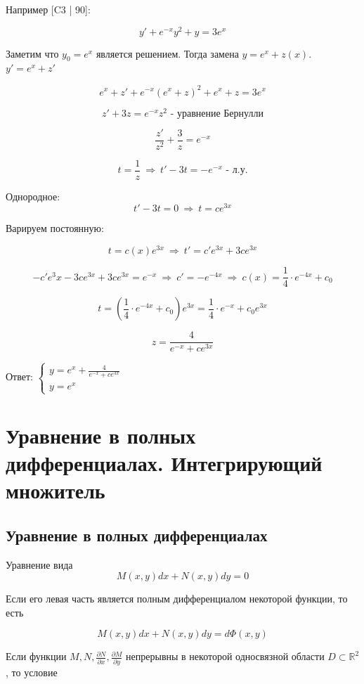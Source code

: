 Например [C3 | 90]:

\[
y'+e^{-x}y^2+y=3e^x
\]

Заметим что $y_0=e^x$ является решением. Тогда замена $y=e^x+z(x)$. $y'=e^x+z'$

\[
e^x+z'+e^{-x}(e^x+z)^2+e^x+z=3e^x
\]

\[
z'+3z=e^{-x}z^2 \text{ - уравнение Бернулли}
\]

\[
\frac{z'}{z^2}+\frac{3}{z}=e^{-x}
\]

\[
t=\frac{1}{z}\ \Rightarrow \ t'-3t=-e^{-x} \text{ - л.у.} 
\]

Однородное:
\[
t'-3t=0\ \Rightarrow \ t=ce^{3x}
\]

Варируем постоянную:

\[
t=c(x)e^{3x} \ \Rightarrow \ t'=c'e^{3x} + 3ce^{3x}
\]

\[
-c'e^3x-3ce^{3x}+3ce^{3x}=e^{-x} \ \Rightarrow \ c'=-e^{-4x} \ \Rightarrow \ c(x)=\frac{1}{4}\cdot e^{-4x}+c_0
\]

\[
t=\left(\frac{1}{4}\cdot e^{-4x}+c_0\right)e^{3x}=\frac{1}{4}\cdot e^{-x}+c_0e^{3x}
\]

\[
z=\frac{4}{e^{-x}+ce^{3x}}
\]

Ответ: $
\begin{cases} 
    y=e^x+\frac{4}{e^{-x}+ce^{3x}} \\ 
    y=e^x
\end{cases}
$

\section{Уравнение в полных дифференциалах. Интегрирующий множитель}

\subsection{Уравнение в полных дифференциалах}

Уравнение вида
\begin{equation}
    M(x, y)dx+N(x, y)dy=0
    \label{eq:pd}
\end{equation}

Если его левая часть является полным дифференциалом некоторой функции, то есть

\[
M(x, y)dx+N(x, y)dy=d\Phi(x, y)
\]

Если функции $M, N, \frac{\partial N}{\partial x}, \frac{\partial M}{\partial y}$ непрерывны в некоторой односвязной области $D\subset \mathbb{R}^2$, то условие

